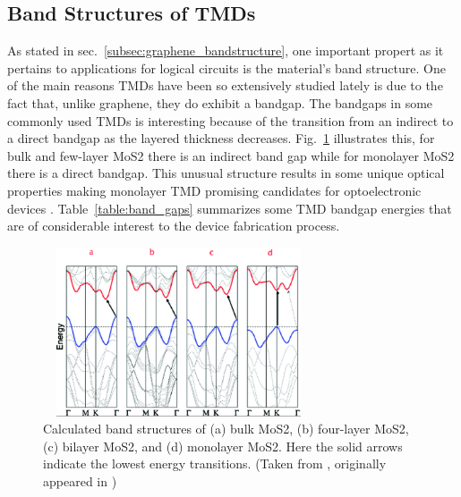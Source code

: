 \subsection{Band Structures of \acp{TMD}}\label{subsec:tmd_properties}
\noindent As stated in sec.~\ref{subsec:graphene_bandstructure}, one important propert as it pertains to applications for logical circuits is the material's band structure. One of the main reasons \acp{TMD} have been so extensively studied lately is due to the fact that, unlike graphene, they do exhibit a bandgap. The bandgaps in some commonly used \acp{TMD} is interesting because of the transition from an indirect to a direct bandgap as the layered thickness decreases. Fig.~\ref{fig:mos2_bandstructure} illustrates this, for bulk and few-layer \acs{MoS2} there is an indirect band gap while for monolayer \acs{MoS2} there is a direct bandgap. This unusual structure results in some unique optical properties making monolayer \acs{TMD} promising candidates for optoelectronic devices \cite{Cheng_NanoLett2014,Conley_NanoLett2013}. Table~\ref{table:band_gaps} summarizes some \acs{TMD} bandgap energies that are of considerable interest to the device fabrication process. 
\begin{figure}[ht]
	\centering
	\includegraphics[height=5cm,width=8cm]{figs/intro/mos2_bandstructure}
	\caption[Band structures of \acs{MoS2}]{Calculated band structures of (a) bulk \acs{MoS2}, (b) four-layer \acs{MoS2}, (c) bilayer \acs{MoS2}, and (d) monolayer \acs{MoS2}. Here the solid arrows indicate the lowest energy transitions. (Taken from \cite{Lee_Nanoscale2014}, originally appeared in \cite{Splendiani_Nanolett2010})}
	\label{fig:mos2_bandstructure}
\end{figure}
 
